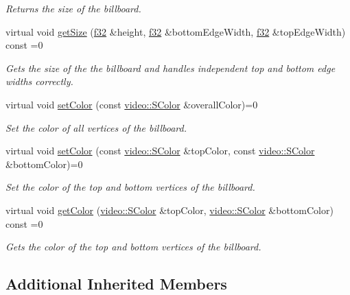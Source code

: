\begin{DoxyCompactItemize}
\begin{DoxyCompactList}\small\item\em Returns the size of the billboard. \end{DoxyCompactList}\item 
virtual void \hyperlink{classirr_1_1scene_1_1IBillboardSceneNode_a79a636a0da637eaa9c061138f5ef3f68}{get\+Size} (\hyperlink{namespaceirr_a0277be98d67dc26ff93b1a6a1d086b07}{f32} \&height, \hyperlink{namespaceirr_a0277be98d67dc26ff93b1a6a1d086b07}{f32} \&bottom\+Edge\+Width, \hyperlink{namespaceirr_a0277be98d67dc26ff93b1a6a1d086b07}{f32} \&top\+Edge\+Width) const =0
\begin{DoxyCompactList}\small\item\em Gets the size of the the billboard and handles independent top and bottom edge widths correctly. \end{DoxyCompactList}\item 
virtual void \hyperlink{classirr_1_1scene_1_1IBillboardSceneNode_a82c1038a6dfcd255863baa96aaba4182}{set\+Color} (const \hyperlink{classirr_1_1video_1_1SColor}{video\+::\+S\+Color} \&overall\+Color)=0
\begin{DoxyCompactList}\small\item\em Set the color of all vertices of the billboard. \end{DoxyCompactList}\item 
virtual void \hyperlink{classirr_1_1scene_1_1IBillboardSceneNode_a13efdfa73998706baf10cedcdb48d559}{set\+Color} (const \hyperlink{classirr_1_1video_1_1SColor}{video\+::\+S\+Color} \&top\+Color, const \hyperlink{classirr_1_1video_1_1SColor}{video\+::\+S\+Color} \&bottom\+Color)=0
\begin{DoxyCompactList}\small\item\em Set the color of the top and bottom vertices of the billboard. \end{DoxyCompactList}\item 
virtual void \hyperlink{classirr_1_1scene_1_1IBillboardSceneNode_a0b2729cc4913b0890ae28cf0ef0ab949}{get\+Color} (\hyperlink{classirr_1_1video_1_1SColor}{video\+::\+S\+Color} \&top\+Color, \hyperlink{classirr_1_1video_1_1SColor}{video\+::\+S\+Color} \&bottom\+Color) const =0
\begin{DoxyCompactList}\small\item\em Gets the color of the top and bottom vertices of the billboard. \end{DoxyCompactList}\end{DoxyCompactItemize}
\subsection*{Additional Inherited Members}


